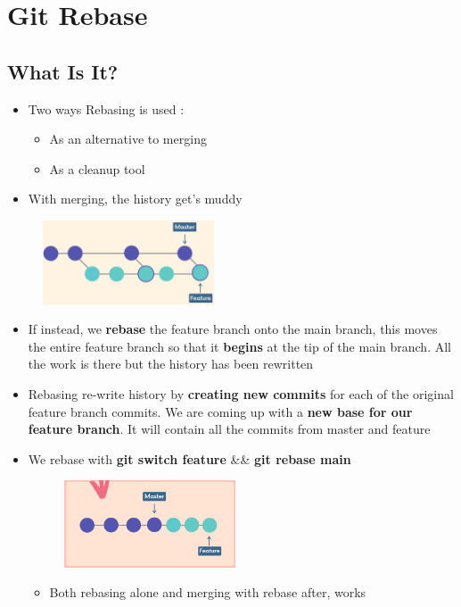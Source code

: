 \documentclass{report}
\begin{document}
\chapter{Git Rebase}


\section{What Is It?}

\begin{itemize}
	\item Two ways Rebasing is used :
		\begin{itemize}
			\item As an alternative to merging 
			\item As a cleanup tool
		\end{itemize}
	\item With merging, the history get's muddy
\end{itemize}
\begin{figure}[H] 
	 \centering 
	 \includegraphics[width=2in]{screenshots/2022-07-09T20-15-48Z.png} 
 \end{figure}

\begin{itemize}
	\item If instead, we \textbf{rebase} the feature branch onto the main branch, this moves the entire feature branch so that it \textbf{begins} at the tip of the main branch. All the work is there but the history has been rewritten 
	\item Rebasing re-write history by \textbf{creating new commits} for each of the original feature branch commits. We are coming up with a \textbf{new base for our feature branch}. It will contain all the commits from master and feature  
	\item We rebase with \textbf{git switch feature} \&\& \textbf{git rebase main} 
\begin{figure}[H] 
	 \centering 
	 \includegraphics[width=2in]{screenshots/2022-07-09T20-22-40Z.png} 
\end{figure}

\begin{itemize}
	\item Both rebasing alone and merging with rebase after, works
\end{itemize}

\end{itemize}
\end{document}
